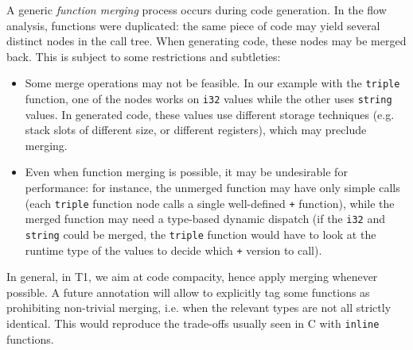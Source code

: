A generic \emph{function merging} process occurs during code generation.
In the flow analysis, functions were duplicated: the same piece of code
may yield several distinct nodes in the call tree. When generating code,
these nodes may be merged back. This is subject to some restrictions and
subtleties:
\begin{itemize}

    \item Some merge operations may not be feasible. In our example with
    the \verb|triple| function, one of the nodes works on \verb|i32|
    values while the other uses \verb|string| values. In generated code,
    these values use different storage techniques (e.g. stack slots of
    different size, or different registers), which may preclude merging.

    \item Even when function merging is possible, it may be undesirable
    for performance: for instance, the unmerged function may have only
    simple calls (each \verb|triple| function node calls a single
    well-defined \verb|+| function), while the merged function may need
    a type-based dynamic dispatch (if the \verb|i32| and \verb|string|
    could be merged, the \verb|triple| function would have to look at
    the runtime type of the values to decide which \verb|+| version to
    call).

\end{itemize}

\begin{rationale}
In general, in T1, we aim at code compacity, hence apply merging
whenever possible. A future annotation will allow to explicitly tag some
functions as prohibiting non-trivial merging, i.e. when the relevant
types are not all strictly identical. This would reproduce the trade-offs
usually seen in C with \verb|inline| functions.
\end{rationale}
